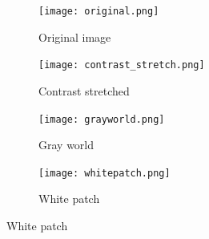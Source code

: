 \documentclass[12pt,a4paper]{article}
\begin{document}
\begin{figure}[htb]
	\centering
	\begin{subfigure}[h!]{0.24\textwidth}
		\centering
		\texttt{[image: original.png]}
		\caption{Original image}
		\label{fig:orig}
	\end{subfigure}
	\begin{subfigure}[h!]{0.24\textwidth}
		\centering
		\texttt{[image: contrast\_stretch.png]}
		\caption{Contrast stretched}
		\label{fig:constretch}
	\end{subfigure}
	\begin{subfigure}[h!]{0.24\textwidth}
		\centering
		\texttt{[image: grayworld.png]}
		\caption{Gray world}
		\label{fig:grayworld}
	\end{subfigure}
	\begin{subfigure}[h!]{0.24\textwidth}
		\centering
		\texttt{[image: whitepatch.png]}
		\caption{White patch}
		\label{fig:whitepatch}
	\end{subfigure}
	

\end{figure}
\end{document}
